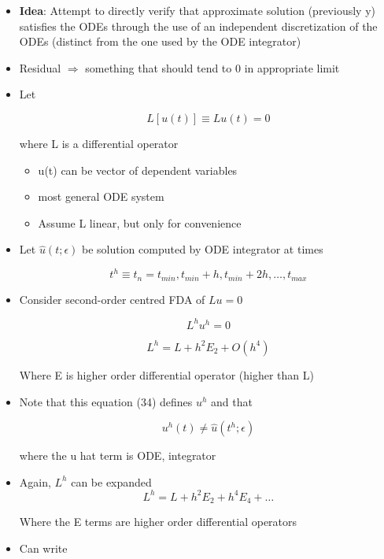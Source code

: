 \begin{itemize}
    \item \textbf{Idea}: Attempt to directly verify that approximate solution (previously y) satisfies the ODEs through the use of an independent discretization of the ODEs (distinct from the one used by the ODE integrator)

    \item Residual $\Rightarrow$ something that should tend to 0 in appropriate limit

    \item Let 

    \[ L[u(t)] \equiv Lu(t) = 0 \]

    where L is a differential operator 

    \begin{itemize}
        \item u(t) can be vector of dependent variables 
        \item most general ODE system 
        \item Assume L linear, but only for convenience
    \end{itemize}

    \item Let $\hat{u}(t;\epsilon)$ be solution computed by ODE integrator at times 

    \[ t^{h} \equiv t_n = t_{min}, t_{min}+h, t_{min}+2h, \ldots, t_{max} \]

    \item Consider second-order centred FDA of $Lu=0$

    \[ L^h u^h = 0\]

    \begin{equation}
        L^h = L + h^2E_2 + O(h^4)
    \end{equation}

    Where E is higher order differential operator (higher than L)

    \item Note that this equation (34) defines $u^h$ and that

    \[ u^h(t) \neq \hat{u}(t^h;\epsilon)\]

    where the u hat term is ODE, integrator

    \item Again, $L^{h}$ can be expanded
    \[ L^h = L + h^2 E_2 + h^4 E_4+ \ldots \]

    Where the E terms are higher order differential operators

    \item Can write


\end{itemize}
